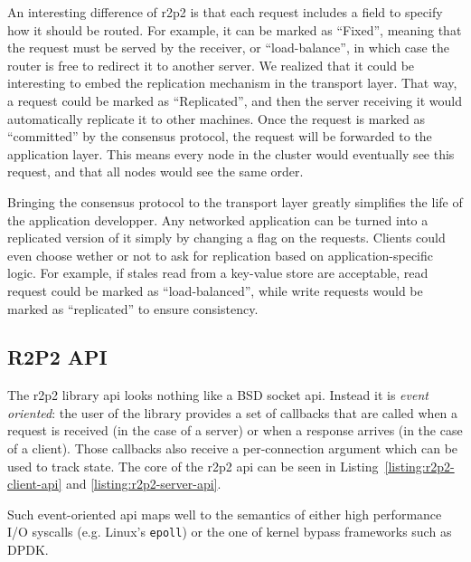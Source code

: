 An interesting difference of \gls{r2p2} is that each request includes a field to specify how it should be routed.
For example, it can be marked as ``Fixed'', meaning that the request must be served by the receiver, or ``load-balance'', in which case the router is free to redirect it to another server.
We realized that it could be interesting to embed the replication mechanism in the transport layer.
That way, a request could be marked as ``Replicated'', and then the server receiving it would automatically replicate it to other machines.
Once the request is marked as ``committed'' by the consensus protocol, the request will be forwarded to the application layer.
This means every node in the cluster would eventually see this request, and that all nodes would see the same order.

Bringing the consensus protocol to the transport layer greatly simplifies the life of the application developper.
Any networked application can be turned into a replicated version of it simply by changing a flag on the requests.
Clients could even choose wether or not to ask for replication based on application-specific logic.
For example, if stales read from a key-value store are acceptable, read request could be marked as ``load-balanced'', while write requests would be marked as ``replicated'' to ensure consistency.

\subsection{R2P2 API}

The \gls{r2p2} library \gls{api} looks nothing like a BSD socket \gls{api}.
Instead it is \emph{event oriented}: the user of the library provides a set of callbacks that are called when a request is received (in the case of a server) or when a response arrives (in the case of a client).
Those callbacks also receive a per-connection argument which can be used to track state.
The core of the \gls{r2p2} \gls{api} can be seen in Listing~\ref{listing:r2p2-client-api} and \ref{listing:r2p2-server-api}.

Such event-oriented \gls{api} maps well to the semantics of either high performance I/O syscalls (e.g. Linux's \texttt{epoll}) or the one of kernel bypass frameworks such as DPDK.

\begin{lstfloat}

\end{lstfloat}

